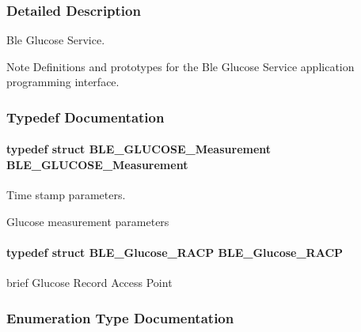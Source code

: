 \subsubsection{Detailed Description}
Ble Glucose Service. 

\begin{DoxyNote}{Note}
Definitions and prototypes for the Ble Glucose Service application programming interface. 
\end{DoxyNote}


\subsubsection{Typedef Documentation}
\paragraph[{\texorpdfstring{B\+L\+E\+\_\+\+G\+L\+U\+C\+O\+S\+E\+\_\+\+Measurement}{BLE_GLUCOSE_Measurement}}]{\setlength{\rightskip}{0pt plus 5cm}typedef struct {\bf B\+L\+E\+\_\+\+G\+L\+U\+C\+O\+S\+E\+\_\+\+Measurement} {\bf B\+L\+E\+\_\+\+G\+L\+U\+C\+O\+S\+E\+\_\+\+Measurement}}\hypertarget{group___b_l_e___g_s_ga8be1fbb6fa8e32337f5d100f6653e06e}{}\label{group___b_l_e___g_s_ga8be1fbb6fa8e32337f5d100f6653e06e}


Time stamp parameters. 

Glucose measurement parameters 
\paragraph[{\texorpdfstring{B\+L\+E\+\_\+\+Glucose\+\_\+\+R\+A\+CP}{BLE_Glucose_RACP}}]{\setlength{\rightskip}{0pt plus 5cm}typedef struct {\bf B\+L\+E\+\_\+\+Glucose\+\_\+\+R\+A\+CP} {\bf B\+L\+E\+\_\+\+Glucose\+\_\+\+R\+A\+CP}}\hypertarget{group___b_l_e___g_s_gad603a274a4f36aa80acc5e6d8cdf792d}{}\label{group___b_l_e___g_s_gad603a274a4f36aa80acc5e6d8cdf792d}
brief Glucose Record Access Point 

\subsubsection{Enumeration Type Documentation}
